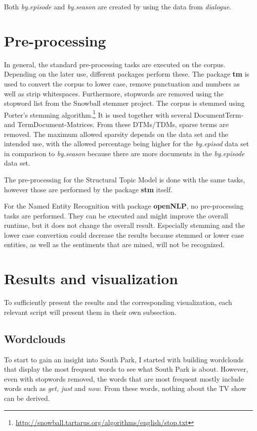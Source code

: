 \documentclass[10pt,a4paper]{article}
\begin{document}
	 Both \textit{by.episode} and \textit{by.season} are created by using the data from \textit{dialogue}.
	
	
	
	
	\section{Pre-processing}
	In general, the standard pre-processing tasks are executed on the corpus. Depending on the later use, different packages perform these.
	The package \textbf{tm} is used to convert the corpus to lower case, remove punctuation and numbers as well as strip whitespaces. Furthermore, stopwords are removed using the stopword list from the Snowball stemmer project. The corpus is stemmed using Porter's stemming algorithm.\footnote{\url{http://snowball.tartarus.org/algorithms/english/stop.txt}} It is used together with several DocumentTerm- and TermDocument-Matrices. From these DTMs/TDMs, sparse terms are removed. The maximum allowed sparsity depends on the data set and the intended use, with the allowed percentage being higher for the \textit{by.episod} data set in comparison to \textit{by.season} because there are more documents in the \textit{by.episode} data set. 
	
	The pre-processing for the Structural Topic Model is done with the same tasks, however those are performed by the package \textbf{stm} itself.
	
	For the Named Entity Recognition with package \textbf{openNLP}, no pre-processing tasks are performed. They can be executed and might improve the overall runtime, but it does not change the overall result. Especially stemming and the lower case convertion could decrease the results because stemmed or lower case entities, as well as the sentiments that are mined, will not be recognized.

	
	
	\section{Results and visualization}
	
	To sufficiently present the results and the corresponding visualization, each relevant script will present them in their own subsection.
	
	\subsection{Wordclouds}
	To start to gain an insight into South Park, I started with building wordclouds that display the most frequent words to see what South Park is about. However, even with stopwords removed, the words that are most frequent mostly include words such as \textit{get, just} and \textit{now}. From these words, nothing about the TV show can be derived. 
	
\end{document}
